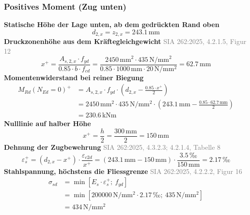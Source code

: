 \documentclass[11pt,a4paper]{article}
\newcommand{\normref}[1]{{\small\textcolor{gray}{#1}}}
\begin{document}
\subsubsection{Positives Moment (Zug unten)}
\noindent\textbf{Statische Höhe der Lage unten, ab dem gedrückten Rand oben}
\begin{equation*}
d_{2,x} = z_{2,x} = 243.1\,\mathrm{mm}
\end{equation*}
\noindent\textbf{Druckzonenhöhe aus dem Kräftegleichgewicht} \hfill \normref{SIA 262:2025, 4.2.1.5, Figur 12}
\begin{equation*}
x^{+} = \frac{A_{s,2,x} \cdot f_{yd}}{0.85 \cdot b \cdot f_{cd}} = \frac{2450\,\mathrm{mm}^{2} \cdot 435\,\mathrm{N}/\mathrm{mm}^{2}}{0.85 \cdot 1000\,\mathrm{mm} \cdot 20\,\mathrm{N}/\mathrm{mm}^{2}} = 62.7\,\mathrm{mm}
\end{equation*}
\noindent\textbf{Momentenwiderstand bei reiner Biegung}
\begin{equation*}
\begin{aligned}
  M_{Rd}(N_{Ed}=0)^{+} &= A_{s,2,x} \cdot f_{yd} \cdot \left(d_{2,x} - \frac{0.85 \cdot x^{+}}{2}\right) \\
  &= 2450\,\mathrm{mm}^{2} \cdot 435\,\mathrm{N}/\mathrm{mm}^{2} \cdot \left(243.1\,\mathrm{mm} - \frac{0.85 \cdot 62.7\,\mathrm{mm}}{2}\right) \\
  &= 230.6\,\mathrm{kNm}
\end{aligned}
\end{equation*}
\noindent\textbf{Nulllinie auf halber Höhe}
\begin{equation*}
x^{+} = \frac{h}{2} = \frac{300\,\mathrm{mm}}{2} = 150\,\mathrm{mm}
\end{equation*}
\noindent\textbf{Dehnung der Zugbewehrung} \hfill \normref{SIA 262:2025, 4.3.2.3; 4.2.1.4, Tabelle 8}
\begin{equation*}
\varepsilon_s^{+} = \left(d_{2,x} - x^{+}\right) \cdot \frac{\varepsilon_{c2d}}{x^{+}} = \left(243.1\,\mathrm{mm} - 150\,\mathrm{mm}\right) \cdot \frac{3.5\,\text{‰}}{150\,\mathrm{mm}} = 2.17\,\text{‰}
\end{equation*}
\noindent\textbf{Stahlspannung, höchstens die Fliessgrenze} \hfill \normref{SIA 262:2025, 4.2.2.2, Figur 16}
\begin{equation*}
\begin{aligned}
  \sigma_{sd} &= \min\left[E_s \cdot \varepsilon_s^{+};\ f_{yd}\right] \\
  &= \min\left[200000\,\mathrm{N}/\mathrm{mm}^{2} \cdot 2.17\,\text{‰};\ 435\,\mathrm{N}/\mathrm{mm}^{2}\right] \\
  &= 434\,\mathrm{N}/\mathrm{mm}^{2}
\end{aligned}
\end{equation*}
\end{document}
